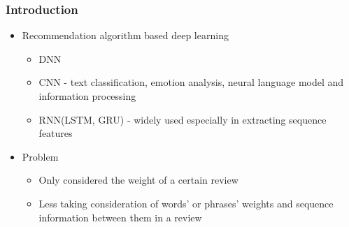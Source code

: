 \documentclass{../presentation}
\begin{document}
    \begin{frame}
        \frametitle{Introduction}

        \begin{itemize}
            \item Recommendation algorithm based deep learning
            \begin{itemize}
                \item DNN
                \item CNN\cite{kim2014convolution, ji2019twitter} - text classification, emotion analysis, neural language model and information processing
                \item RNN(LSTM, GRU) - widely used especially in extracting sequence features
            \end{itemize}
            \item Problem
            \begin{itemize}
                \item Only considered the weight of a certain review
                \item Less taking consideration of words' or phrases' weights and sequence information between them in a review
            \end{itemize}
        \end{itemize}

    \end{frame}
\end{document}
